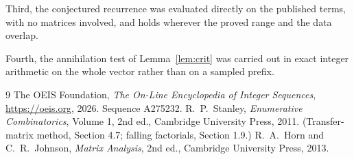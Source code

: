 \documentclass[11pt,a4paper]{article}
\theoremstyle{plain}
\theoremstyle{definition}
\begin{document}
Third, the conjectured recurrence was evaluated directly on the published terms, with no
matrices involved, and holds wherever the proved range and the data overlap.

Fourth, the annihilation test of Lemma~\ref{lem:crit} was carried out in exact integer
arithmetic on the whole vector rather than on a sampled prefix.

\begin{thebibliography}{9}
 The OEIS Foundation, \emph{The On-Line Encyclopedia of Integer
Sequences}, \url{https://oeis.org}, 2026. Sequence A275232.
 R.~P.~Stanley, \emph{Enumerative Combinatorics}, Volume 1, 2nd ed.,
Cambridge University Press, 2011. (Transfer-matrix method, Section 4.7; falling factorials,
Section 1.9.)
 R.~A.~Horn and C.~R.~Johnson, \emph{Matrix Analysis}, 2nd ed., Cambridge
University Press, 2013.
\end{thebibliography}
\end{document}
